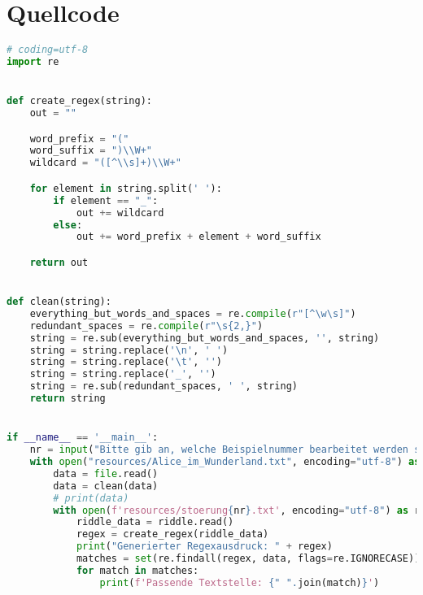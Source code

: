 \section{Quellcode}\label{sec:quellcode}
\begin{lstlisting}[language=Python,label={lst:sourcecode}]
# coding=utf-8
import re


def create_regex(string):
    out = ""

    word_prefix = "("
    word_suffix = ")\\W+"
    wildcard = "([^\\s]+)\\W+"

    for element in string.split(' '):
        if element == "_":
            out += wildcard
        else:
            out += word_prefix + element + word_suffix

    return out


def clean(string):
    everything_but_words_and_spaces = re.compile(r"[^\w\s]")
    redundant_spaces = re.compile(r"\s{2,}")
    string = re.sub(everything_but_words_and_spaces, '', string)
    string = string.replace('\n', ' ')
    string = string.replace('\t', '')
    string = string.replace('_', '')
    string = re.sub(redundant_spaces, ' ', string)
    return string


if __name__ == '__main__':
    nr = input("Bitte gib an, welche Beispielnummer bearbeitet werden soll: ")
    with open("resources/Alice_im_Wunderland.txt", encoding="utf-8") as file:
        data = file.read()
        data = clean(data)
        # print(data)
        with open(f'resources/stoerung{nr}.txt', encoding="utf-8") as riddle:
            riddle_data = riddle.read()
            regex = create_regex(riddle_data)
            print("Generierter Regexausdruck: " + regex)
            matches = set(re.findall(regex, data, flags=re.IGNORECASE))
            for match in matches:
                print(f'Passende Textstelle: {" ".join(match)}')
\end{lstlisting}


